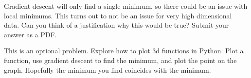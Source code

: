 \documentclass[11pt,letterpaper]{article}
\begin{document}
\begin{problem}
 Gradient descent will only find a single minimum, so there could be an issue with local minimums. This turns out to not be an issue for very high dimensional data. Can you think of a justification why this would be true? Submit your answer as a PDF. 
\end{problem}

\begin{problem}
 This is an optional problem. Explore how to plot 3d functions in Python. Plot a function, use gradient descent to find the minimum, and plot the point on the graph. Hopefully the minimum you find coincides with the minimum.
\end{problem}
\end{document}
